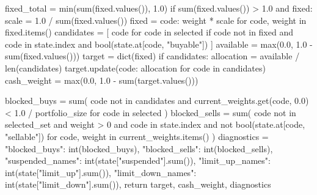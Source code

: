 \documentclass[UTF8,a4paper,fontset=fandol]{ctexart}
\begin{document}
\begin{ProjectCode}
    fixed_total = min(sum(fixed.values()), 1.0)
    if sum(fixed.values()) > 1.0 and fixed:
        scale = 1.0 / sum(fixed.values())
        fixed = {code: weight * scale for code, weight in fixed.items()}
    candidates = [
        code
        for code in selected
        if code not in fixed
        and code in state.index
        and bool(state.at[code, "buyable"])
    ]
    available = max(0.0, 1.0 - sum(fixed.values()))
    target = dict(fixed)
    if candidates:
        allocation = available / len(candidates)
        target.update({code: allocation for code in candidates})
    cash_weight = max(0.0, 1.0 - sum(target.values()))

    blocked_buys = sum(
        code not in candidates
        and current_weights.get(code, 0.0) < 1.0 / portfolio_size
        for code in selected
    )
    blocked_sells = sum(
        code not in selected_set
        and weight > 0
        and code in state.index
        and not bool(state.at[code, "sellable"])
        for code, weight in current_weights.items()
    )
    diagnostics = {
        "blocked_buys": int(blocked_buys),
        "blocked_sells": int(blocked_sells),
        "suspended_names": int(state["suspended"].sum()),
        "limit_up_names": int(state["limit_up"].sum()),
        "limit_down_names": int(state["limit_down"].sum()),
    }
    return target, cash_weight, diagnostics



\end{ProjectCode}
\end{document}
